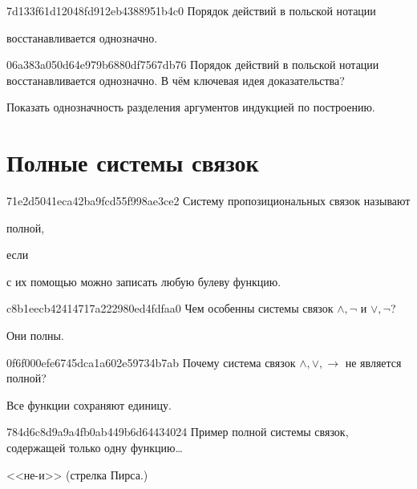 \begin{note}{7d133f61d12048fd912eb4388951b4c0}
    Порядок действий в польской нотации \begin{icloze}{1}восстанавливается однозначно.\end{icloze}
\end{note}

\begin{note}{06a383a050d64e979b6880df7567db76}
    Порядок действий в польской нотации восстанавливается однозначно.
    В чём ключевая идея доказательства?

    \begin{cloze}{1}
        Показать однозначность разделения аргументов индукцией по построению.
    \end{cloze}
\end{note}

\section{Полные системы связок}
\begin{note}{71e2d5041eca42ba9fcd55f998ae3ce2}
    Систему пропозициональных связок называют \begin{icloze}{2}полной,\end{icloze} если \begin{icloze}{1}с их помощью можно записать любую булеву функцию.\end{icloze}
\end{note}

\begin{note}{c8b1eecb42414717a222980ed4fdfaa0}
    Чем особенны системы связок \({ \land, \lnot }\) и \({ \lor, \lnot }\)?

    \begin{cloze}{1}
        Они полны.
    \end{cloze}
\end{note}

\begin{note}{0f6f000efe6745dca1a602e59734b7ab}
    Почему система связок \({ \land, \lor, \to }\) не является полной?

    \begin{cloze}{1}
        Все функции сохраняют единицу.
    \end{cloze}
\end{note}

\begin{note}{784d6c8d9a9a4fb0ab449b6d64434024}
    Пример полной системы связок, содержащей только одну функцию\ldots

    \begin{cloze}{1}
        <<не-и>> (стрелка Пирса.)
    \end{cloze}
\end{note}

